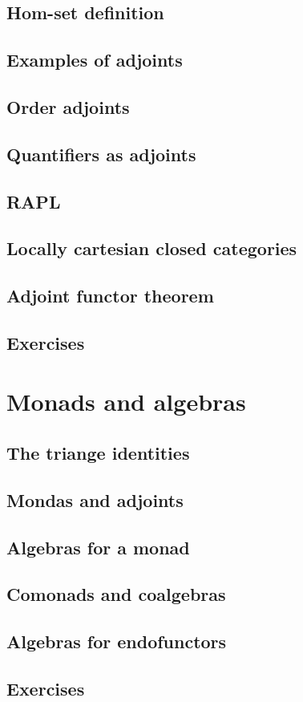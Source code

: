 \documentclass[uplatex, 12pt, dvipdfmx]{jsarticle}
\begin{document}
\subsection{Hom-set definition}

\subsection{Examples of adjoints}

\subsection{Order adjoints}

\subsection{Quantifiers as adjoints}

\subsection{RAPL}

\subsection{Locally cartesian closed categories}

\subsection{Adjoint functor theorem}

\subsection{Exercises}

\section{Monads and algebras}

\subsection{The triange identities}

\subsection{Mondas and adjoints}

\subsection{Algebras for a monad}

\subsection{Comonads and coalgebras}

\subsection{Algebras for endofunctors}

\subsection{Exercises}
\end{document}
